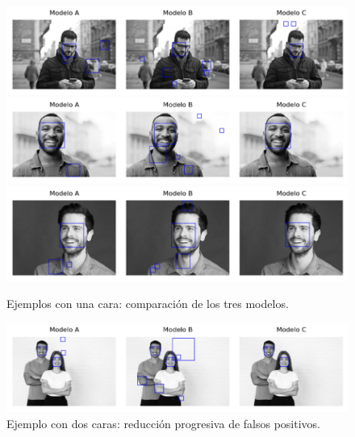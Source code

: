 \documentclass{article}
\begin{document}
\begin{figure}[H]
  \centering
  \includegraphics[width=\linewidth]{tarea_6/imagenes/1-faces_1.png}\\[4pt]
  \includegraphics[width=\linewidth]{tarea_6/imagenes/1-faces_2.png}\\[4pt]
  \includegraphics[width=\linewidth]{tarea_6/imagenes/1-faces_3.png}
  \caption{Ejemplos con una cara: comparación de los tres modelos.}
  \label{fig:modelos-1f}
\end{figure}

\begin{figure}[H]
  \centering
  \includegraphics[width=\linewidth]{tarea_6/imagenes/2-faces_2.png}
  \caption{Ejemplo con dos caras: reducción progresiva de falsos positivos.}
  \label{fig:modelos-2f}
\end{figure}
\end{document}
